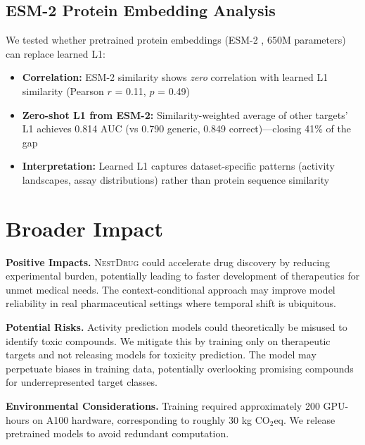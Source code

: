 \documentclass[sigconf,anonymous]{acmart}
\newcommand{\methodname}{\textsc{NestDrug}}
\begin{document}
\subsection{ESM-2 Protein Embedding Analysis}

We tested whether pretrained protein embeddings (ESM-2 \cite{lin_2023_esm2}, 650M parameters) can replace learned L1:

\begin{itemize}[noitemsep,topsep=0pt]
\item \textbf{Correlation:} ESM-2 similarity shows \textit{zero} correlation with learned L1 similarity (Pearson $r$ = 0.11, $p$ = 0.49)
\item \textbf{Zero-shot L1 from ESM-2:} Similarity-weighted average of other targets' L1 achieves 0.814 AUC (vs 0.790 generic, 0.849 correct)---closing 41\% of the gap
\item \textbf{Interpretation:} Learned L1 captures dataset-specific patterns (activity landscapes, assay distributions) rather than protein sequence similarity
\end{itemize}

\section{Broader Impact}
\label{app:impact}

\textbf{Positive Impacts.} \methodname{} could accelerate drug discovery by reducing experimental burden, potentially leading to faster development of therapeutics for unmet medical needs. The context-conditional approach may improve model reliability in real pharmaceutical settings where temporal shift is ubiquitous.

\textbf{Potential Risks.} Activity prediction models could theoretically be misused to identify toxic compounds. We mitigate this by training only on therapeutic targets and not releasing models for toxicity prediction. The model may perpetuate biases in training data, potentially overlooking promising compounds for underrepresented target classes.

\textbf{Environmental Considerations.} Training required approximately 200 GPU-hours on A100 hardware, corresponding to roughly 30 kg CO$_2$eq. We release pretrained models to avoid redundant computation.
\end{document}
